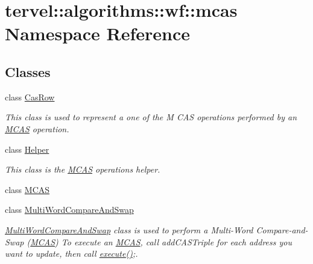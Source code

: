 \hypertarget{namespacetervel_1_1algorithms_1_1wf_1_1mcas}{}\section{tervel\+:\+:algorithms\+:\+:wf\+:\+:mcas Namespace Reference}
\label{namespacetervel_1_1algorithms_1_1wf_1_1mcas}
\subsection*{Classes}
\begin{DoxyCompactItemize}
\item 
class \hyperlink{classtervel_1_1algorithms_1_1wf_1_1mcas_1_1_cas_row}{Cas\+Row}
\begin{DoxyCompactList}\small\item\em This class is used to represent a one of the M C\+A\+S operations performed by an \hyperlink{classtervel_1_1algorithms_1_1wf_1_1mcas_1_1_m_c_a_s}{M\+C\+A\+S} operation. \end{DoxyCompactList}\item 
class \hyperlink{classtervel_1_1algorithms_1_1wf_1_1mcas_1_1_helper}{Helper}
\begin{DoxyCompactList}\small\item\em This class is the \hyperlink{classtervel_1_1algorithms_1_1wf_1_1mcas_1_1_m_c_a_s}{M\+C\+A\+S} operation\textquotesingle{}s helper. \end{DoxyCompactList}\item 
class \hyperlink{classtervel_1_1algorithms_1_1wf_1_1mcas_1_1_m_c_a_s}{M\+C\+A\+S}
\item 
class \hyperlink{classtervel_1_1algorithms_1_1wf_1_1mcas_1_1_multi_word_compare_and_swap}{Multi\+Word\+Compare\+And\+Swap}
\begin{DoxyCompactList}\small\item\em \hyperlink{classtervel_1_1algorithms_1_1wf_1_1mcas_1_1_multi_word_compare_and_swap}{Multi\+Word\+Compare\+And\+Swap} class is used to perform a Multi-\/\+Word Compare-\/and-\/\+Swap (\hyperlink{classtervel_1_1algorithms_1_1wf_1_1mcas_1_1_m_c_a_s}{M\+C\+A\+S}) To execute an \hyperlink{classtervel_1_1algorithms_1_1wf_1_1mcas_1_1_m_c_a_s}{M\+C\+A\+S}, call add\+C\+A\+S\+Triple for each address you want to update, then call \hyperlink{classtervel_1_1algorithms_1_1wf_1_1mcas_1_1_multi_word_compare_and_swap_a3cf56f32c7579f734b1e0ecbd8d9c7f3}{execute()};. \end{DoxyCompactList}\end{DoxyCompactItemize}
